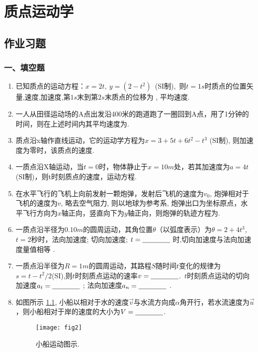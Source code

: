 \chapter{质点运动学}
\section{作业习题}
\subsection*{一、填空题}
\begin{enumerate}
    \item 已知质点的运动方程：$x =2t,\ y =(2-t^2)$\ (SI制),\ 则$t=1s$时质点的位置矢量\nl,速度\nl ,加速度\nl,第$1s$末到第$2s$末质点的位移为
    \nl, 平均速度\nl .
    \item 一人从田径运动场的A点出发沿400米的跑道跑了一圈回到A点，用了1分钟的时间，则在上述时间内其平均速度为\nl .
    \item 质点沿x轴作直线运动，它的运动学方程为$x = 3+5t+6t^2-t^3$ (SI制), 则加速度为零时，该质点的速度\nl .
    \item 一质点沿X轴运动，当$t=0$时，物体静止于$x=10m$处，若其加速度为$a=4t$(SI制)，则t时刻质点的速度\nl，运动方程\nl .
    \item 在水平飞行的飞机上向前发射一颗炮弹，发射后飞机的速度为$v_0$, 炮弹相对于飞机的速度为$v$, 略去空气阻力, 则以地球为参考系, 炮弹出口为坐标原点，水平飞行方向为$x$轴正向，竖直向下为$y$轴正向，则炮弹的轨迹方程为\nl .
    \item 一质点沿半径为$0.10m$的圆周运动，其角位置$\theta$（以弧度表示）为$\theta=2+4t^3$,\ $t=2$秒时，法向加速度\nl; 切向加速度\nl; $t = \nl$ 时,切向加速度与法向加速度量值相等 .
    \item 一质点沿半径为$R=1m$的圆周运动，其路程$S$随时间$t$变化的规律为$s=t-t^2/2$(SI),则$t$时刻质点运动的速率$v=\nl$.\ $t$时刻质点运动的切向加速度$a_t=\nl$ ; 法向加速度$a_n=\nl$ .
    \item 如图所示 \ref{fig:2}, 小船以相对于水的速度$\vec{v}$与水流方向成$\alpha$角开行，若水流速度为$\vec{u}$，则小船相对于岸的速度的大小为$V=\nl$.
    \begin{figure}[H]
        \centering
        \texttt{[image: fig2]}
        \caption{小船运动图示.}\label{fig:2}
    \end{figure}
\end{enumerate}
